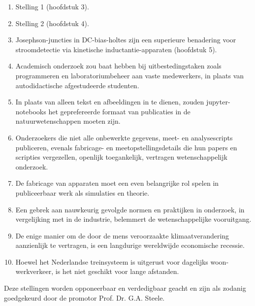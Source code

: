 \documentclass{dissertation-edit}
\begin{document}
{\begin{enumerate}
\item Stelling 1 (hoofdstuk 3).
%
\item Stelling 2 (hoofdstuk 4).
%
\item Josephson-juncties in DC-bias-holtes zijn een superieure benadering voor stroomdetectie via kinetische inductantie-apparaten (hoofdstuk 5).
%
\item Academisch onderzoek zou baat hebben bij uitbestedingstaken zoals programmeren en laboratoriumbeheer aan vaste medewerkers, in plaats van autodidactische afgestudeerde studenten.
%
\item In plaats van alleen tekst en afbeeldingen in te dienen, zouden jupyter-notebooks het geprefereerde formaat van publicaties in de natuurwetenschappen moeten zijn.
\item Onderzoekers die niet alle onbewerkte gegevens, meet- en analysescripts publiceren, evenals fabricage- en meetopstellingsdetails die hun papers en scripties vergezellen, openlijk toegankelijk, vertragen wetenschappelijk onderzoek.
%
\item De fabricage van apparaten moet een even belangrijke rol spelen in publiceerbaar werk als simulaties en theorie.
%
\item Een gebrek aan nauwkeurig gevolgde normen en praktijken in onderzoek, in vergelijking met in de industrie, belemmert de wetenschappelijke vooruitgang.
%
\item De enige manier om de door de mens veroorzaakte klimaatverandering aanzienlijk te vertragen, is een langdurige wereldwijde economische recessie.
%
\item Hoewel het Nederlandse treinsysteem is uitgerust voor dagelijks woon-werkverkeer, is het niet geschikt voor lange afstanden.

\end{enumerate}

\bigskip
\bigskip

\begin{center}
Deze stellingen worden opponeerbaar en verdedigbaar geacht en zijn als zodanig goedgekeurd door de promotor Prof. Dr. G.A. Steele.
\end{center}

}
\end{document}
